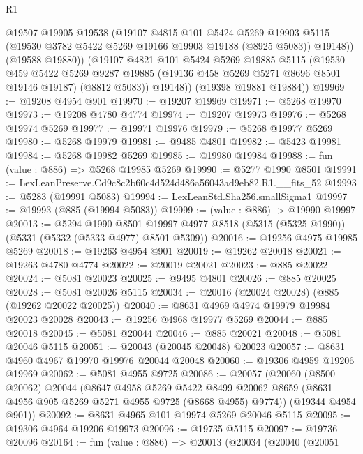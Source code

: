 \begin{lexlean}{R1}
\begin{coremodule}
            @19507
            @19905
            @19538
            (@19107
              @4815
              @101
              @5424
              @5269
              @19903
              @5115
              (@19530 @3782 @5422 @5269 @19166 @19903 @19188 (@8925 @5083))
              @19148))
          (@19588 @19880))
        (@19107
          @4821
          @101
          @5424
          @5269
          @19885
          @5115
          (@19530
            @459
            @5422
            @5269
            @9287
            @19885
            (@19136 @458 @5269 @5271 @8696 @8501 @19146 @19187)
            (@8812 @5083))
          @19148))
      (@19398 @19881 @19884))
@19969 := @19208 @4954 @901
@19970 := @19207 @19969
@19971 := @5268 @19970
@19973 := @19208 @4780 @4774
@19974 := @19207 @19973
@19976 := @5268 @19974 @5269
@19977 := @19971 @19976
@19979 := @5268 @19977 @5269
@19980 := @5268 @19979
@19981 := @9485 @4801
@19982 := @5423 @19981
@19984 := @5268 @19982 @5269
@19985 := @19980 @19984
@19988 := fun (value : @886) => @5268 @19985 @5269
@19990 := @5277 @1990 @8501
@19991 := LexLeanPreserve.Cd9c8c2b60c4d524d486a56043ad9eb82.R1.__fits_52
@19993 := @5283 (@19991 @5083)
@19994 := LexLeanStd.Sha256.smallSigma1
@19997 := @19993 (@885 (@19994 @5083))
@19999 := (value : @886) -> @19990 @19997
@20013 := @5294
    @1990
    @8501
    @19997
    @4977
    @8518
    (@5315 (@5325 @1990))
    (@5331 (@5332 (@5333 @4977) @8501 @5309))
@20016 := @19256 @4975 @19985 @5269
@20018 := @19263 @4954 @901
@20019 := @19262 @20018
@20021 := @19263 @4780 @4774
@20022 := @20019 @20021
@20023 := @885 @20022
@20024 := @5081 @20023
@20025 := @9495 @4801
@20026 := @885 @20025
@20028 := @5081 @20026 @5115
@20034 := @20016 (@20024 @20028) (@885 (@19262 @20022 @20025))
@20040 := @8631 @4969 @4974 @19979 @19984 @20023 @20028
@20043 := @19256 @4968 @19977 @5269
@20044 := @885 @20018
@20045 := @5081 @20044
@20046 := @885 @20021
@20048 := @5081 @20046 @5115
@20051 := @20043 (@20045 @20048) @20023
@20057 := @8631 @4960 @4967 @19970 @19976 @20044 @20048
@20060 := @19306 @4959 @19206 @19969
@20062 := @5081 @4955 @9725
@20086 := @20057
    (@20060
      (@8500 @20062)
      @20044
      (@8647
        @4958
        @5269
        @5422
        @8499
        @20062
        @8659
        (@8631 @4956 @905 @5269 @5271 @4955 @9725 (@8668 @4955) @9774))
      (@19344 @4954 @901))
@20092 := @8631 @4965 @101 @19974 @5269 @20046 @5115
@20095 := @19306 @4964 @19206 @19973
@20096 := @19735 @5115
@20097 := @19736 @20096
@20164 := fun (value : @886) =>
  @20013
    (@20034
      (@20040
        (@20051

\end{coremodule}
\end{lexlean}
